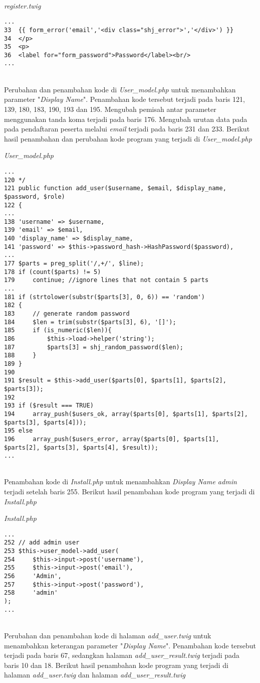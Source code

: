 ~\\
\textit{register.twig}
\begin{lstlisting}[basicstyle=\ttfamily, frame=single,
columns=fullflexible, keepspaces=true, breaklines=true]
...
33	{{ form_error('email','<div class="shj_error">','</div>') }}
34	</p>
35	<p>
36	<label for="form_password">Password</label><br/>
...
\end{lstlisting}
~\\
Perubahan dan penambahan kode di \textit{User\_model.php} untuk menambahkan parameter "\textit{Display Name}". Penambahan kode tersebut terjadi pada baris 121, 139, 180, 183, 190, 193 dan 195. Mengubah pemisah antar parameter menggunakan tanda koma terjadi pada baris 176. Mengubah urutan data pada pada pendaftaran peserta melalui \textit{email} terjadi pada baris 231 dan 233. Berikut hasil penambahan dan perubahan kode program yang terjadi di \textit{User\_model.php}

\textit{User\_model.php}
\begin{lstlisting}[basicstyle=\ttfamily, frame=single,
columns=fullflexible, keepspaces=true, breaklines=true]
...
120	*/
121	public function add_user($username, $email, $display_name, $password, $role)
122	{
...
138	'username' => $username,
139	'email' => $email,
140	'display_name' => $display_name,
141	'password' => $this->password_hash->HashPassword($password),
...
177	$parts = preg_split('/,+/', $line);
178	if (count($parts) != 5)
179		continue; //ignore lines that not contain 5 parts
...
181	if (strtolower(substr($parts[3], 0, 6)) == 'random')
182	{
183		// generate random password
184		$len = trim(substr($parts[3], 6), '[]');
185		if (is_numeric($len)){
186			$this->load->helper('string');
187			$parts[3] = shj_random_password($len);
188		}
189	}
190	
191	$result = $this->add_user($parts[0], $parts[1], $parts[2], $parts[3]);
192	
193	if ($result === TRUE)
194		array_push($users_ok, array($parts[0], $parts[1], $parts[2], $parts[3], $parts[4]));
195	else
196		array_push($users_error, array($parts[0], $parts[1], $parts[2], $parts[3], $parts[4], $result));
...
\end{lstlisting}
~\\
Penambahan kode di \textit{Install.php} untuk menambahkan \textit{Display Name admin} terjadi setelah baris 255. Berikut hasil penambahan kode program yang terjadi di \textit{Install.php}
 
\textit{Install.php}
\begin{lstlisting}[basicstyle=\ttfamily, frame=single,
columns=fullflexible, keepspaces=true, breaklines=true]
...
252	// add admin user
253	$this->user_model->add_user(
254		$this->input->post('username'),
255		$this->input->post('email'),
256		'Admin',
257		$this->input->post('password'),
258		'admin'
);
...
\end{lstlisting}
~\\ 
Perubahan dan penambahan kode di halaman \textit{add\_user.twig} untuk menambahkan keterangan parameter "\textit{Display Name}". Penambahan kode tersebut terjadi pada baris 67, sedangkan halaman \textit{add\_user\_result.twig} terjadi pada baris 10 dan 18. Berikut hasil penambahan kode program yang terjadi di halaman \textit{add\_user.twig} dan halaman \textit{add\_user\_result.twig}

